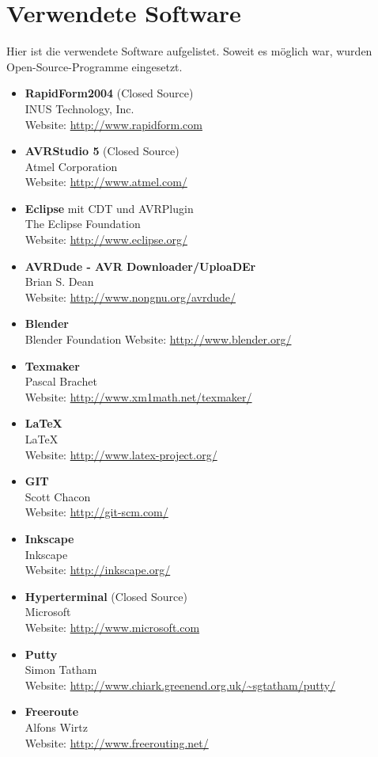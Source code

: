 \section{Verwendete Software}
\label{sec:V_Software}
Hier ist die verwendete Software aufgelistet. Soweit es möglich war, wurden Open-Source-Programme eingesetzt.
\begin{itemize}
\item \textbf{RapidForm2004} (Closed Source)\\
INUS Technology, Inc.\\
Website: \url{http://www.rapidform.com}
\item \textbf{AVRStudio 5}  (Closed Source)\\
Atmel Corporation \\
Website: \url{http://www.atmel.com/}  
\item \textbf{Eclipse} mit CDT und AVRPlugin\\
The Eclipse Foundation\\
Website: \url{http://www.eclipse.org/}  
\item \textbf{AVRDude - AVR Downloader/UploaDEr} \\
Brian S. Dean\\
Website: \url{http://www.nongnu.org/avrdude/}
\item \textbf{Blender}\\
Blender Foundation
Website: \url{http://www.blender.org/}
\item \textbf{Texmaker}\\
Pascal Brachet\\
Website: \url{http://www.xm1math.net/texmaker/}
\item \textbf{LaTeX}\\
LaTeX\\
Website: \url{http://www.latex-project.org/}
\item \textbf{GIT}\\
Scott Chacon\\
Website: \url {http://git-scm.com/}
\item \textbf{Inkscape}\\
Inkscape\\
Website: \url{http://inkscape.org/}
\item \textbf{Hyperterminal} (Closed Source)\\
Microsoft\\
Website: \url{http://www.microsoft.com}
\item \textbf{Putty}\\
Simon Tatham\\
Website: \url{http://www.chiark.greenend.org.uk/~sgtatham/putty/}
\item \textbf{Freeroute}\\
Alfons Wirtz\\
Website: \url{http://www.freerouting.net/}

\end{itemize}